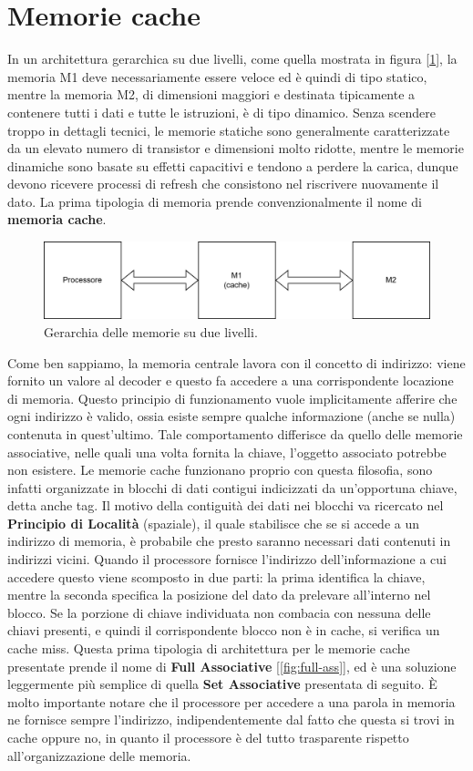 \section{Memorie cache}
In un architettura gerarchica su due livelli, come quella mostrata in figura [\ref{fig:2livmem}], la memoria M1 deve necessariamente essere veloce ed è quindi di tipo statico, mentre la memoria M2, di dimensioni maggiori e destinata tipicamente a contenere tutti i dati e tutte le istruzioni, è di tipo dinamico. Senza scendere troppo in dettagli tecnici, le memorie statiche sono generalmente caratterizzate da un elevato numero di transistor e dimensioni molto ridotte, mentre le memorie dinamiche sono basate su effetti capacitivi e tendono a perdere la carica, dunque devono ricevere processi di refresh che consistono nel riscrivere nuovamente il dato. La prima tipologia di memoria prende convenzionalmente il nome di \textbf{memoria cache}.
\begin{figure}[!h]
    \centering
    \includegraphics[width=0.6\linewidth]{img/2liv_mem.png}
    \caption{Gerarchia delle memorie su due livelli.}
    \label{fig:2livmem}
\end{figure}

Come ben sappiamo, la memoria centrale lavora con il concetto di indirizzo: viene fornito un valore al decoder e questo fa accedere a una corrispondente locazione di memoria. Questo principio di funzionamento vuole implicitamente afferire che ogni indirizzo è valido, ossia esiste sempre qualche informazione (anche se nulla) contenuta in quest'ultimo. Tale comportamento differisce da quello delle memorie associative, nelle quali una volta fornita la chiave, l'oggetto associato potrebbe non esistere. Le memorie cache funzionano proprio con questa filosofia, sono infatti organizzate in blocchi di dati contigui indicizzati da un'opportuna chiave, detta anche tag. Il motivo della contiguità dei dati nei blocchi va ricercato nel \textbf{Principio di Località} (spaziale), il quale stabilisce che se si accede a un indirizzo di memoria, è probabile che presto saranno necessari dati contenuti in indirizzi vicini. Quando il processore fornisce l'indirizzo dell'informazione a cui accedere questo viene scomposto in due parti: la prima identifica la chiave, mentre la seconda specifica la posizione del dato da prelevare all'interno nel blocco. Se la porzione di chiave individuata non combacia con nessuna delle chiavi presenti, e quindi il corrispondente blocco non è in cache, si verifica un cache miss. Questa prima tipologia di architettura per le memorie cache presentate prende il nome di \textbf{Full Associative} [\ref{fig:full-ass}], ed è una soluzione leggermente più semplice di quella \textbf{Set Associative} presentata di seguito. \MakeUppercase{è} molto importante notare che il processore per accedere a una parola in memoria ne fornisce sempre l'indirizzo, indipendentemente dal fatto che questa si trovi in cache oppure no, in quanto il processore è del tutto trasparente rispetto all'organizzazione delle memoria.

